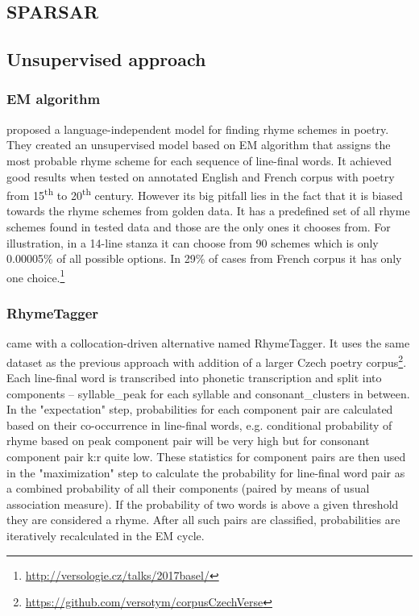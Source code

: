 \subsection{SPARSAR}


\subsection{Unsupervised approach}
\subsubsection*{EM algorithm}
\cite{reddy2011unsupervised} proposed a language-independent model for finding rhyme schemes in poetry. They created an unsupervised model based on EM algorithm that assigns the most probable rhyme scheme for each sequence of line-final words. It achieved good results when tested on annotated English and French corpus with poetry from 15\textsuperscript{th} to 20\textsuperscript{th} century. However its big pitfall lies in the fact that it is biased towards the rhyme schemes from golden data. It has a predefined set of all rhyme schemes found in tested data and those are the only ones it chooses from. For illustration, in a 14-line stanza it can choose from 90 schemes which is only 0.00005\% of all possible options. In 29\% of cases from French corpus it has only one choice.\footnote{\url{http://versologie.cz/talks/2017basel/}}

\subsubsection*{RhymeTagger}
\cite{plechavc2018collocation} came with a collocation-driven alternative named RhymeTagger. It uses the same dataset as the previous approach with addition of a larger Czech poetry corpus\footnote{\url{https://github.com/versotym/corpusCzechVerse}}. Each line-final word is transcribed into phonetic transcription and split into components -- \gls{syllable_peak} for each syllable and \gls{consonant_clusters} in between. In the "expectation" step, probabilities for each component pair are calculated based on their co-occurrence in line-final words, e.g. conditional probability of rhyme based on peak component pair  will be very high but for consonant component pair k:r quite low. These statistics for component pairs are then used in the "maximization" step to calculate the probability for line-final word pair as a combined probability of all their components (paired by means of usual association measure). If the probability of two words is above a given threshold they are considered a rhyme. After all such pairs are classified, probabilities are iteratively recalculated in the EM cycle. 

